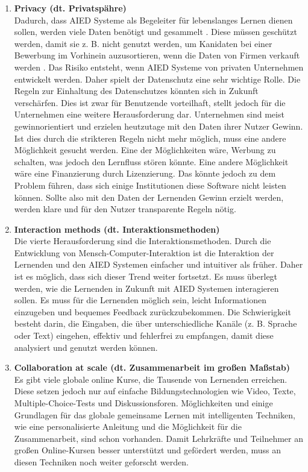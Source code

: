 \begin{enumerate}
      \item \textbf{Privacy (dt. Privatspähre)} \\
            Dadurch, dass AIED Systeme als Begeleiter für lebenslanges Lernen dienen sollen, werden viele Daten benötigt und gesammelt \cite[S. 10]{Pinkwart.2016}.
            Diese müssen geschützt werden, damit sie z. B. nicht genutzt werden, um Kanidaten bei einer Bewerbung im Vorhinein auzusortieren, wenn die Daten von Firmen verkauft werden \cite[S. 9f]{Pinkwart.2016}.
            Das Risiko entsteht, wenn AIED Systeme von privaten Unternehmen entwickelt werden. Daher spielt der Datenschutz eine sehr wichtige Rolle. Die Regeln zur Einhaltung des Datenschutzes könnten sich in Zukunft verschärfen.
            Dies ist zwar für Benutzende vorteilhaft, stellt jedoch für die Unternehmen eine weitere Herausforderung dar. Unternehmen sind meist gewinnorientiert und erzielen heutzutage mit den Daten ihrer Nutzer Gewinn.
            Ist dies durch die strikteren Regeln nicht mehr möglich, muss eine andere Möglichkeit gesucht werden. Eine der Möglichkeiten wäre, Werbung zu schalten, was jedoch den Lernfluss stören könnte.
            Eine andere Möglichkeit wäre eine Finanzierung durch Lizenzierung. Das könnte jedoch zu dem Problem führen, dass sich einige Institutionen diese Software nicht leisten können.
            Sollte also mit den Daten der Lernenden Gewinn erzielt werden, werden klare und für den Nutzer transparente Regeln nötig. \cite[S. 10f]{Pinkwart.2016}

      \item \textbf{Interaction methods (dt. Interaktionsmethoden)} \\
            Die vierte Herausforderung sind die Interaktionsmethoden. Durch die Entwicklung von Mensch-Computer-Interaktion ist die Interaktion der Lernenden und den AIED Systemen einfacher und intuitiver als früher.
            Daher ist es möglich, dass sich dieser Trend weiter fortsetzt. Es muss überlegt werden, wie die Lernenden in Zukunft mit AIED Systemen interagieren sollen.
            Es muss für die Lernenden möglich sein, leicht Informationen einzugeben und bequemes Feedback zurückzubekommen.
            Die Schwierigkeit besteht darin, die Eingaben, die über unterschiedliche Kanäle (z. B. Sprache oder Text) eingehen, effektiv und fehlerfrei zu empfangen, damit diese analysiert und genutzt werden können. \cite[S. 11]{Pinkwart.2016}

      \item \textbf{Collaboration at scale (dt. Zusammenarbeit im großen Maßstab)} \\
            Es gibt viele globale online Kurse, die Tausende von Lernenden erreichen. Diese setzen jedoch nur auf einfache Bildungstechnologien wie Video, Texte, Multiple-Choice-Tests und Diskussionsforen.
            Möglichkeiten und einige Grundlagen für das globale gemeinsame Lernen mit intelligenten Techniken, wie eine personalisierte Anleitung und die Möglichkeit für die Zusammenarbeit, sind schon vorhanden.
            Damit Lehrkräfte und Teilnehmer an großen Online-Kursen besser unterstützt und gefördert werden, muss an diesen Techniken noch weiter geforscht werden. \cite[S. 11]{Pinkwart.2016}


\end{enumerate}
